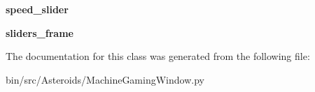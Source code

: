 \begin{DoxyCompactItemize}
\item 
{\bfseries speed\+\_\+slider}\hypertarget{classMachineGamingWindow_1_1MachineGaming_af7c7c359266bfb1d16fc8fb45259eef6}{}\label{classMachineGamingWindow_1_1MachineGaming_af7c7c359266bfb1d16fc8fb45259eef6}

\item 
{\bfseries sliders\+\_\+frame}\hypertarget{classMachineGamingWindow_1_1MachineGaming_a80b48006f970e43673c576d5c688ff8a}{}\label{classMachineGamingWindow_1_1MachineGaming_a80b48006f970e43673c576d5c688ff8a}

\end{DoxyCompactItemize}


The documentation for this class was generated from the following file\+:\begin{DoxyCompactItemize}
\item 
bin/src/\+Asteroids/Machine\+Gaming\+Window.\+py\end{DoxyCompactItemize}
